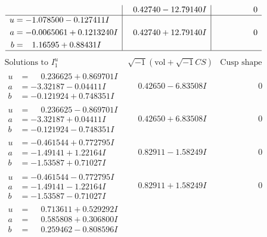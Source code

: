 \documentclass[1p]{elsarticle_modified}
\theoremstyle{definition}
\newcommand{\I}{\sqrt{-1}}
\begin{document}
$$\begin{array}{c|c|c}
 & \phantom{-}0.42740 - 12.79140 I & \phantom{-0.000000 } 0 \\ \hline\begin{aligned}
u &= -1.078500 - 0.127411 I \\
a &= -0.0065061 + 0.1213240 I \\
b &= \phantom{-}1.16595 + 0.88431 I\end{aligned}
 & \phantom{-}0.42740 + 12.79140 I & \phantom{-0.000000 } 0\\
 \hline 
 \end{array}$$\newpage$$\begin{array}{c|c|c}  
\text{Solutions to }I^u_{1}& \I (\text{vol} + \sqrt{-1}CS) & \text{Cusp shape}\\
 \hline 
\begin{aligned}
u &= \phantom{-}0.236625 + 0.869701 I \\
a &= -3.32187 - 0.04411 I \\
b &= -0.121924 + 0.748351 I\end{aligned}
 & \phantom{-}0.42650 - 6.83508 I & \phantom{-0.000000 } 0 \\ \hline\begin{aligned}
u &= \phantom{-}0.236625 - 0.869701 I \\
a &= -3.32187 + 0.04411 I \\
b &= -0.121924 - 0.748351 I\end{aligned}
 & \phantom{-}0.42650 + 6.83508 I & \phantom{-0.000000 } 0 \\ \hline\begin{aligned}
u &= -0.461544 + 0.772795 I \\
a &= -1.49141 + 1.22164 I \\
b &= -1.53587 + 0.71027 I\end{aligned}
 & \phantom{-}0.82911 - 1.58249 I & \phantom{-0.000000 } 0 \\ \hline\begin{aligned}
u &= -0.461544 - 0.772795 I \\
a &= -1.49141 - 1.22164 I \\
b &= -1.53587 - 0.71027 I\end{aligned}
 & \phantom{-}0.82911 + 1.58249 I & \phantom{-0.000000 } 0 \\ \hline\begin{aligned}
u &= \phantom{-}0.713611 + 0.529292 I \\
a &= \phantom{-}0.585808 + 0.306800 I \\
b &= \phantom{-}0.259462 - 0.808596 I\end{aligned}

\end{array}$$
\end{document}
